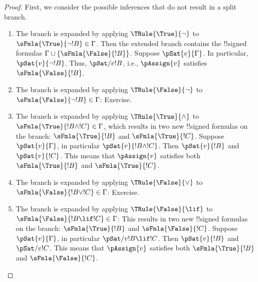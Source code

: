 \begin{proof}
First, we consider the possible inferences that do not result in a split branch.
\begin{enumerate}
\item The branch is expanded by applying $\TRule{\True}{\lnot}$ to
  $\sFmla{\True}{\lnot !B} \in \Gamma$. Then the extended branch
  contains the !!{signed formula}s $\Gamma \cup
  \{\sFmla{\False}{!B}\}$.  Suppose
  $\pSat{v}{\Gamma}$. In particular,
  $\pSat{v}{\lnot !B}$. Thus,
  $\pSat/{v}{!B}$, i.e.,
  $\pAssign{v}$ satisfies
  $\sFmla{\False}{!B}$.
\item The branch is expanded by applying $\TRule{\False}{\lnot}$ to
  $\sFmla{\False}{\lnot !B} \in \Gamma$: Exercise.
\item The branch is expanded by applying $\TRule{\True}{\land}$ to
  $\sFmla{\True}{!B \land !C} \in \Gamma$, which results in two new
  !!{signed formula}s on the branch: $\sFmla{\True}{!B}$ and
  $\sFmla{\True}{!C}$. Suppose
  $\pSat{v}{\Gamma}$, in particular
  $\pSat{v}{!B \land !C}$. Then
  $\pSat{v}{!B}$ and
  $\pSat{v}{!C}$. This means that
  $\pAssign{v}$ satisfies both
  $\sFmla{\True}{!B}$ and $\sFmla{\True}{!C}$.
\item The branch is expanded by applying $\TRule{\False}{\lor}$ to
  $\sFmla{\False}{!B \lor !C} \in \Gamma$: Exercise.
\item The branch is expanded by applying $\TRule{\False}{\lif}$ to
  $\sFmla{\False}{!B \lif !C} \in \Gamma$: This results in two new
  !!{signed formula}s on the branch: $\sFmla{\True}{!B}$ and
  $\sFmla{\False}{!C}$. Suppose
  $\pSat{v}{\Gamma}$, in particular
  $\pSat/{v}{!B \lif !C}$. Then
  $\pSat{v}{!B}$ and
  $\pSat/{v}{!C}$. This means that
  $\pAssign{v}$ satisfies both
  $\sFmla{\True}{!B}$ and $\sFmla{\False}{!C}$.



\end{enumerate}
\end{proof}
